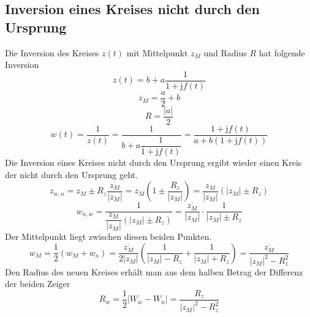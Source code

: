 \subsection{Inversion eines Kreises nicht durch den Ursprung}
Die Inversion des Kreises $z\left(t\right)$ mit Mittelpunkt $z_M$ und Radius $R$ hat folgende Inversion
\begin{equation}
\boxed{z\left(t\right)=b+a\dfrac{1}{1+\text{j}f\left(t\right)}}
\end{equation}
\begin{equation}
\boxed{z_M=\dfrac{a}{2}+b}
\end{equation}
\begin{equation}
\boxed{R=\dfrac{\Big\vert a\Big\vert}{2}}
\end{equation}
\begin{equation}
\boxed{w\left(t\right)=\dfrac{1}{z\left(t\right)}=\dfrac{1}{b+a\dfrac{1}{1+\text{j}f\left(t\right)}}=\dfrac{1+\text{j}f\left(t\right)}{a+b\left(1+\text{j}f\left(t\right)\right)}}
\end{equation}
Die Inversion eines Kreises nicht durch den Ursprung ergibt wieder einen Kreis der nicht durch den Ursprung geht.
\begin{equation}
\boxed{z_{w,n}=z_M\pm R_z\dfrac{z_M}{\Big\vert z_M\Big\vert}=z_M\left(1\pm \dfrac{R_z}{\Big\vert z_M\Big\vert}\right)=\dfrac{z_M}{\Big\vert z_M\Big\vert}\left(\Big\vert z_M\Big\vert\pm R_z\right)}
\end{equation}
\begin{equation}
\boxed{w_{n,w}=\dfrac{1}{\dfrac{z_M}{\Big\vert z_M\Big\vert}\left(\Big\vert z_M\Big\vert\pm R_z\right)}=\dfrac{\overline{z_M}}{\Big\vert z_M\Big\vert}\cdot \dfrac{1}{\Big\vert z_M\Big\vert\pm R_z}}
\end{equation}
Der Mittelpunkt liegt zwischen diesen beiden Punkten.
\begin{equation}
\boxed{w_M=\dfrac{1}{2}\left(w_M+w_n\right)=\dfrac{\overline{z_M}}{2\Big\vert z_M\Big\vert}\left(\dfrac{1}{\Big\vert z_M\Big\vert-R_z}+\dfrac{1}{\Big\vert z_M\Big\vert+R_z}\right)=\dfrac{\overline{z_M}}{\Big\vert z_M\Big\vert^2-R_z^2}}
\end{equation}
Den Radius des neuen Kreises erhält man aus dem halben Betrag der Differenz der beiden Zeiger
\begin{equation}
\boxed{R_w=\dfrac{1}{2}\Big\vert W_w-W_n\Big\vert=\dfrac{R_z}{\Big\vert z_M\Big\vert^2-R_z^2}}
\end{equation}
